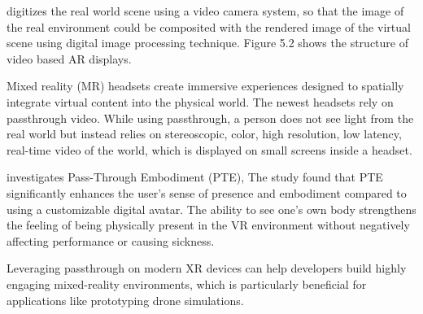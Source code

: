 digitizes the real world scene using a video camera system, so that the image of the real environment could be composited with the rendered image of the virtual scene using digital image processing technique. Figure 5.2 shows the structure of video based AR displays. \parencite{billinghurst_survey_2015}




Mixed reality (MR) headsets create immersive experiences designed to spatially integrate virtual content into the physical world. The newest headsets rely on passthrough video. While using passthrough, a person does not see light from the real world but instead relies on stereoscopic, color, high resolution, low latency, real-time video of the world, which is displayed on small screens inside a headset. \parencite{bailenson2024passthrough}

\textcite{waldow_investigating_2025} investigates Pass-Through Embodiment (PTE), The study found that PTE significantly enhances the user's sense of presence and embodiment compared to using a customizable digital avatar. The ability to see one's own body strengthens the feeling of being physically present in the VR environment without negatively affecting performance or causing sickness.

Leveraging passthrough on modern XR devices can help developers build highly engaging mixed-reality environments, which is particularly beneficial for applications like prototyping drone simulations.
